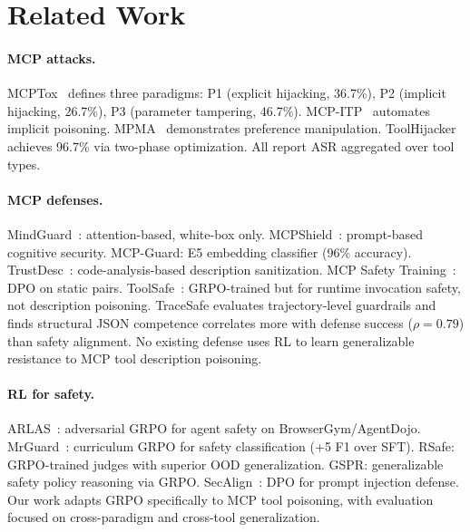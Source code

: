 \documentclass[11pt,a4paper]{article}
\begin{document}
\section{Related Work}
\label{sec:related}

\paragraph{MCP attacks.}
MCPTox~\citep{mcptox} defines three paradigms: P1 (explicit hijacking, 36.7\%), P2 (implicit hijacking, 26.7\%), P3 (parameter tampering, 46.7\%).
MCP-ITP~\citep{mcp-itp} automates implicit poisoning.
MPMA~\citep{mpma} demonstrates preference manipulation.
ToolHijacker~\citep{toolhijacker} achieves 96.7\% via two-phase optimization.
All report ASR aggregated over tool types.

\paragraph{MCP defenses.}
MindGuard~\citep{mindguard}: attention-based, white-box only.
MCPShield~\citep{mcpshield}: prompt-based cognitive security.
MCP-Guard: E5 embedding classifier (96\% accuracy).
TrustDesc~\citep{trustdesc}: code-analysis-based description sanitization.
MCP Safety Training~\citep{mcp-safety-training}: DPO on static pairs.
ToolSafe~\citep{toolsafe}: GRPO-trained but for runtime invocation safety, not description poisoning.
TraceSafe evaluates trajectory-level guardrails and finds structural JSON competence correlates more with defense success ($\rho=0.79$) than safety alignment.
No existing defense uses RL to learn generalizable resistance to MCP tool description poisoning.

\paragraph{RL for safety.}
ARLAS~\citep{arlas}: adversarial GRPO for agent safety on BrowserGym/AgentDojo.
MrGuard~\citep{mrguard}: curriculum GRPO for safety classification (+5 F1 over SFT).
RSafe: GRPO-trained judges with superior OOD generalization.
GSPR: generalizable safety policy reasoning via GRPO.
SecAlign~\citep{secalign}: DPO for prompt injection defense.
Our work adapts GRPO specifically to MCP tool poisoning, with evaluation focused on cross-paradigm and cross-tool generalization.


\end{document}
